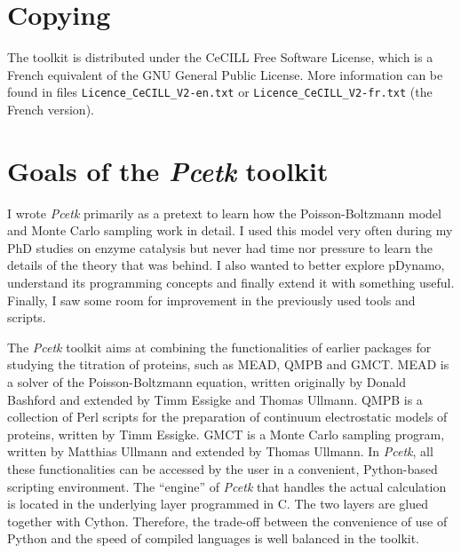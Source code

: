 \documentclass[12pt]{article}
\newcommand{\modulename}{\textit{Pcetk}\xspace}
\begin{document}
\section{Copying}
The toolkit is distributed under the CeCILL Free Software License, which is
a French equivalent of the GNU General Public License.
%
More information can be found in files
{\tt Licence\_CeCILL\_V2-en.txt} or
{\tt Licence\_CeCILL\_V2-fr.txt} (the French version).


\section{Goals of the \modulename toolkit}
I wrote \modulename primarily as a pretext to learn how
the Poisson-Boltzmann model and Monte Carlo sampling work in detail.
%
I used this model very often during my PhD studies on enzyme catalysis but
never had time nor pressure to learn the details of the theory that was behind.
%
I also wanted to better explore pDynamo,
understand its programming concepts and finally extend it
with something useful.
%
Finally,
I saw some room for improvement in the previously used tools and scripts.

The \modulename toolkit aims at combining the functionalities of
earlier packages for studying the titration of proteins,
such as MEAD, QMPB and GMCT.
%
MEAD is a solver of the Poisson-Boltzmann equation,
written originally by Donald Bashford and extended by
Timm Essigke\cite{Essigke_PhD} and Thomas Ullmann\cite{Thomas_PhD}.
%
QMPB is a collection of Perl scripts for the preparation of
continuum electrostatic models of proteins,
written by Timm Essigke\cite{Essigke_PhD}.
%
GMCT is a Monte Carlo sampling program,
written by Matthias Ullmann
and extended by Thomas Ullmann\cite{Ullmann2012}.
%
In \modulename,
all these functionalities can be accessed by the user
in a convenient,
Python-based scripting environment.
%
The ``engine'' of \modulename that handles the actual calculation
is located in the underlying layer programmed in C.
%
The two layers are glued together with Cython.
%
Therefore,
the trade-off between the convenience of use of Python
and the speed of compiled languages is well balanced in the toolkit.


\end{document}

